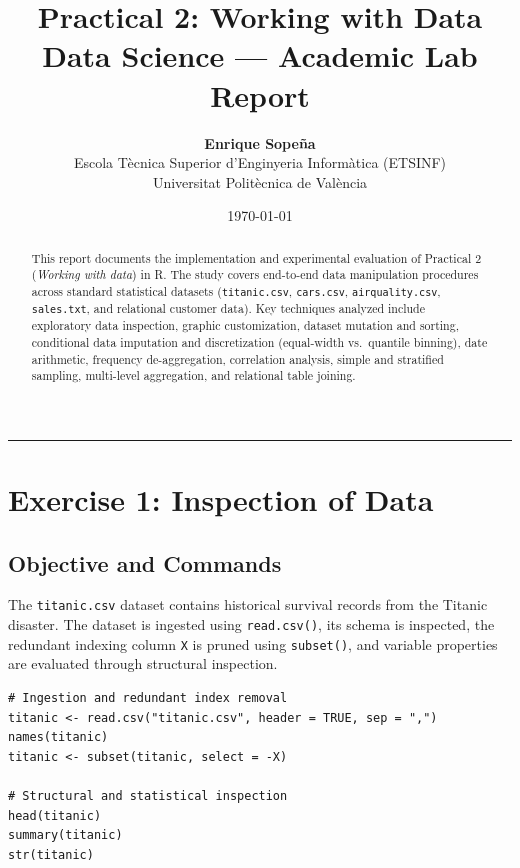 \documentclass[11pt,a4paper]{article}
\title{\textbf{Practical 2: Working with Data}\\[0.4ex] \Large Data Science --- Academic Lab Report}
\author{\textbf{Enrique Sopeña} \\ 
Escola Tècnica Superior d'Enginyeria Informàtica (ETSINF) \\ 
Universitat Politècnica de València}
\date{\today}
\begin{document}
\maketitle

\begin{abstract}
    This report documents the implementation and experimental evaluation of Practical 2 (\textit{Working with data}) in R. The study covers end-to-end data manipulation procedures across standard statistical datasets (\texttt{titanic.csv}, \texttt{cars.csv}, \texttt{airquality.csv}, \texttt{sales.txt}, and relational customer data). Key techniques analyzed include exploratory data inspection, graphic customization, dataset mutation and sorting, conditional data imputation and discretization (equal-width vs.\ quantile binning), date arithmetic, frequency de-aggregation, correlation analysis, simple and stratified sampling, multi-level aggregation, and relational table joining.
\end{abstract}

\vspace{1em}
\hrule
\vspace{1em}

\section{Exercise 1: Inspection of Data}

\subsection{Objective and Commands}
The \texttt{titanic.csv} dataset contains historical survival records from the Titanic disaster. The dataset is ingested using \texttt{read.csv()}, its schema is inspected, the redundant indexing column \texttt{X} is pruned using \texttt{subset()}, and variable properties are evaluated through structural inspection.

\begin{lstlisting}
# Ingestion and redundant index removal
titanic <- read.csv("titanic.csv", header = TRUE, sep = ",")
names(titanic)
titanic <- subset(titanic, select = -X)

# Structural and statistical inspection
head(titanic)
summary(titanic)
str(titanic)
\end{lstlisting}
\end{document}

